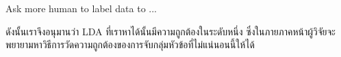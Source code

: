 Ask more human to label data to ...

ดังนั้นเราจึงอนุมานว่า LDA ที่เราหาได้นั้นมีความถูกต้องในระดับหนึ่ง
ซึ่งในภายภาคหน้าผู้วิจัยจะพยายามหาวิธีการวัดความถูกต้องของการจับกลุ่มหัวข้อที่ไม่แน่นอนนี้ให้ได้


%
%


%


